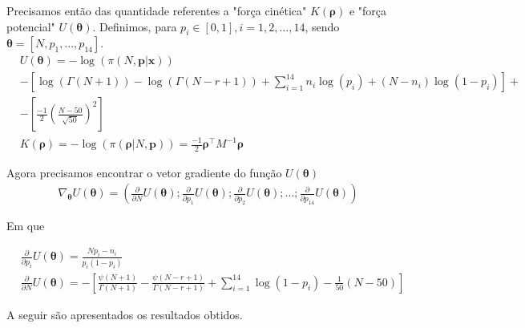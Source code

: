 \documentclass[a4paper,12pt,twoside]{article}
\begin{document}
Precisamos então das quantidade referentes a "força cinética" $K(\bm{\rho})$ e "força potencial" $U(\mathbf{\bm{\theta}})$. Definimos, para $p_i \in [0,1], i=1,2,...,14$, sendo $\bm{\theta}=[N,p_1,...,p_14]$.
\newpage
\begin{align*}
&U(\mathbf{\bm{\theta}})=-\log(\pi(N,\mathbf{p|x}))\\
&-\left[\log(\Gamma(N+1)) - \log(\Gamma(N-r+1)) + \sum_{i=1}^{14}n_i\log(p_i)+(N-n_i)\log(1-p_i)\right] + \\
&- \left[\frac{-1}{2}\left(\frac{N-50}{\sqrt{50}}\right)^2\right]\\
&K(\bm{\rho}) = -\log(\pi(\bm{\rho}|N,\mathbf{p})) = \frac{-1}{2}\bm{\rho}^{\top}M^{-1}\bm{\rho}
\end{align*}

Agora precisamos encontrar o vetor gradiente do função $U(\bm{\theta})$
\begin{align*}
\nabla_{\bm{\theta}}U(\bm{\theta}) = \left(\frac{\partial }{\partial N}U(\bm{\theta});\frac{\partial }{\partial p_1}U(\bm{\theta});\frac{\partial }{\partial p_2}U(\bm{\theta});...;\frac{\partial }{\partial p_{14}}U(\bm{\theta})\right)
\end{align*}

Em que 

\begin{align*}
&\frac{\partial }{\partial p_i}U(\bm{\theta})=\frac{Np_i-n_i}{p_i(1-p_i)}\\
& \frac{\partial }{\partial N}U(\bm{\theta})=-\left[\frac{\psi(N+1)}{\Gamma(N+1)} -  \frac{\psi(N-r+1)}{\Gamma(N-r+1)} + \sum_{i=1}^{14}\log(1-p_i)-\frac{1}{50}(N-50) \right]
\end{align*}

A seguir são apresentados os resultados obtidos.
\end{document}
